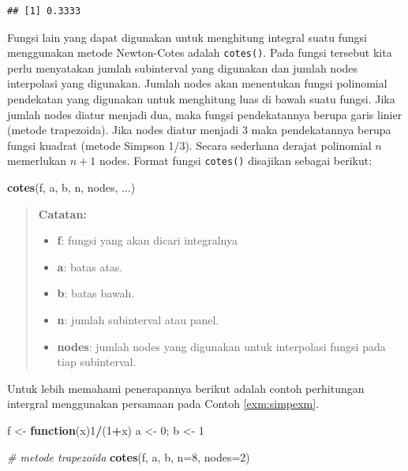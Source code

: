 \documentclass[]{book}
\newenvironment{Shaded}{\begin{snugshade}}{\end{snugshade}}
\newcommand{\CommentTok}[1]{\textcolor[rgb]{0.56,0.35,0.01}{\textit{#1}}}
\newcommand{\ControlFlowTok}[1]{\textcolor[rgb]{0.13,0.29,0.53}{\textbf{#1}}}
\newcommand{\DataTypeTok}[1]{\textcolor[rgb]{0.13,0.29,0.53}{#1}}
\newcommand{\DecValTok}[1]{\textcolor[rgb]{0.00,0.00,0.81}{#1}}
\newcommand{\KeywordTok}[1]{\textcolor[rgb]{0.13,0.29,0.53}{\textbf{#1}}}
\newcommand{\NormalTok}[1]{#1}
\newcommand{\OperatorTok}[1]{\textcolor[rgb]{0.81,0.36,0.00}{\textbf{#1}}}
\newcommand{\StringTok}[1]{\textcolor[rgb]{0.31,0.60,0.02}{#1}}
\providecommand{\tightlist}{%
  \setlength{\itemsep}{0pt}\setlength{\parskip}{0pt}}
\theoremstyle{definition}
\theoremstyle{definition}
\theoremstyle{definition}
\theoremstyle{remark}
\begin{document}
\begin{verbatim}
## [1] 0.3333
\end{verbatim}

Fungsi lain yang dapat digunakan untuk menghitung integral suatu fungsi menggunakan metode Newton-Cotes adalah \texttt{cotes()}. Pada fungsi tersebut kita perlu menyatakan jumlah subinterval yang digunakan dan jumlah nodes interpolasi yang digunakan. Jumlah nodes akan menentukan fungsi polinomial pendekatan yang digunakan untuk menghitung luas di bawah suatu fungsi. Jika jumlah nodes diatur menjadi dua, maka fungsi pendekatannya berupa garis linier (metode trapezoida). Jika nodes diatur menjadi 3 maka pendekatannya berupa fungsi kuadrat (metode Simpson 1/3). Secara sederhana derajat polinomial \(n\) memerlukan \(n+1\) nodes. Format fungsi \texttt{cotes()} disajikan sebagai berikut:

\begin{Shaded}
\begin{Highlighting}[]
\KeywordTok{cotes}\NormalTok{(f, a, b, n, nodes, ...)}
\end{Highlighting}
\end{Shaded}

\begin{quote}
\textbf{Catatan:}

\begin{itemize}
\tightlist
\item
  \textbf{f}: fungsi yang akan dicari integralnya
\item
  \textbf{a}: batas atas.
\item
  \textbf{b}: batas bawah.
\item
  \textbf{n}: jumlah subinterval atau panel.
\item
  \textbf{nodes}: jumlah nodes yang digunakan untuk interpolasi fungsi pada tiap subinterval.
\end{itemize}
\end{quote}

Untuk lebih memahami penerapannya berikut adalah contoh perhitungan intergral menggunakan persamaan pada Contoh \ref{exm:simpexm}.

\begin{Shaded}
\begin{Highlighting}[]
\NormalTok{f <-}\StringTok{ }\ControlFlowTok{function}\NormalTok{(x)}\DecValTok{1}\OperatorTok{/}\NormalTok{(}\DecValTok{1}\OperatorTok{+}\NormalTok{x)}
\NormalTok{a <-}\StringTok{ }\DecValTok{0}\NormalTok{; b <-}\StringTok{ }\DecValTok{1}

\CommentTok{# metode trapezoida}
\KeywordTok{cotes}\NormalTok{(f, a, b, }\DataTypeTok{n=}\DecValTok{8}\NormalTok{, }\DataTypeTok{nodes=}\DecValTok{2}\NormalTok{)}
\end{Highlighting}
\end{Shaded}
\end{document}
